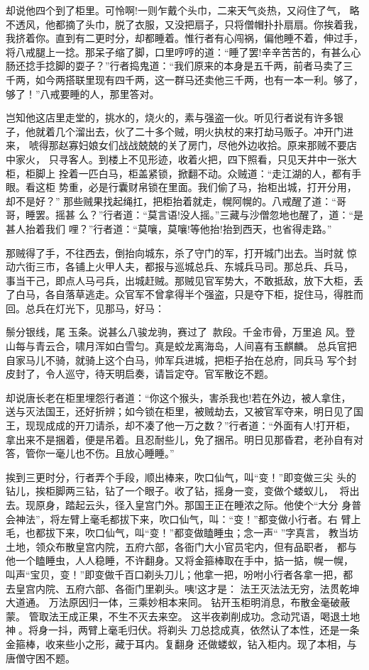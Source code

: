却说他四个到了柜里。可怜啊!一则乍戴个头巾，二来天气炎热，又闷住了气，
略不透风，他都摘了头巾，脱了衣服，又没把扇子，只将僧帽扑扑扇扇。你挨着我，
我挤着你。直到有二更时分，却都睡着。惟行者有心闯祸，偏他睡不着，伸过手，
将八戒腿上一捻。那呆子缩了脚，口里哼哼的道：“睡了罢!辛辛苦苦的，有甚么心
肠还捻手捻脚的耍子？”行者捣鬼道：“我们原来的本身是五千两，前者马卖了三
千两，如今两搭联里现有四千两，这一群马还卖他三千两，也有一本一利。够了，
够了！”八戒要睡的人，那里答对。

岂知他这店里走堂的，挑水的，烧火的，素与强盗一伙。听见行者说有许多银
子，他就着几个溜出去，伙了二十多个贼，明火执杖的来打劫马贩子。冲开门进来，
唬得那赵寡妇娘女们战战兢兢的关了房门，尽他外边收拾。原来那贼不要店中家火，
只寻客人。到楼上不见形迹，收着火把，四下照看，只见天井中一张大柜，柜脚上
拴着一匹白马，柜盖紧锁，掀翻不动。众贼道：“走江湖的人，都有手眼。看这柜
势重，必是行囊财帛锁在里面。我们偷了马，抬柜出城，打开分用，却不是好？”
那些贼果找起绳扛，把柜抬着就走，幌阿幌的。八戒醒了道：“哥哥，睡罢。摇甚
么？”行者道：“莫言语!没人摇。”三藏与沙僧忽地也醒了，道：“是甚人抬着我们
哩？”行者道：“莫嚷，莫嚷!等他抬!抬到西天，也省得走路。”

那贼得了手，不往西去，倒抬向城东，杀了守门的军，打开城门出去。当时就
惊动六街三市，各铺上火甲人夫，都报与巡城总兵、东城兵马司。那总兵、兵马，
事当干己，即点人马弓兵，出城赶贼。那贼见官军势大，不敢抵敌，放下大柜，丢
了白马，各自落草逃走。众官军不曾拿得半个强盗，只是夺下柜，捉住马，得胜而
回。总兵在灯光下，见那马，好马：

鬃分银线，尾玉条。说甚么八骏龙驹，赛过了款段。千金市骨，万里追
风。登山每与青云合，啸月浑如白雪匀。真是蛟龙离海岛，人间喜有玉麒麟。
总兵官把自家马儿不骑，就骑上这个白马，帅军兵进城，把柜子抬在总府，同兵马
写个封皮封了，令人巡守，待天明启奏，请旨定夺。官军散讫不题。

却说唐长老在柜里埋怨行者道：“你这个猴头，害杀我也!若在外边，被人拿住，
送与灭法国王，还好折辨；如今锁在柜里，被贼劫去，又被官军夺来，明日见了国
王，现现成成的开刀请杀，却不凑了他一万之数？”行者道：“外面有人!打开柜，
拿出来不是捆着，便是吊着。且忍耐些儿，免了捆吊。明日见那昏君，老孙自有对
答，管你一毫儿也不伤。且放心睡睡。”

挨到三更时分，行者弄个手段，顺出棒来，吹口仙气，叫“变！”即变做三尖
头的钻儿，挨柜脚两三钻，钻了一个眼子。收了钻，摇身一变，变做个蝼蚁儿，
将出去。现原身，踏起云头，径入皇宫门外。那国王正在睡浓之际。他使个“大分
身普会神法”，将左臂上毫毛都拔下来，吹口仙气，叫：“变！”都变做小行者。右
臂上毛，也都拔下来，吹口仙气，叫“变！”都变做瞌睡虫；念一声“”字真言，
教当坊土地，领众布散皇宫内院，五府六部，各衙门大小官员宅内，但有品职者，
都与他一个瞌睡虫，人人稳睡，不许翻身。又将金箍棒取在手中，掂一掂，幌一幌，
叫声“宝贝，变！”即变做千百口剃头刀儿；他拿一把，吩咐小行者各拿一把，都
去皇宫内院、五府六部、各衙门里剃头。咦!这才是：
法王灭法法无穷，法贯乾坤大道通。
万法原因归一体，三乘妙相本来同。
钻开玉柜明消息，布散金毫破蔽蒙。
管取法王成正果，不生不灭去来空。
这半夜剃削成功。念动咒语，喝退土地神。将身一抖，两臂上毫毛归伏。将剃头
刀总捻成真，依然认了本性，还是一条金箍棒，收来些小之形，藏于耳内。复翻身
还做蝼蚁，钻入柜内。现了本相，与唐僧守困不题。

